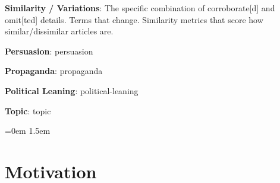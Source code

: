 \textbf{Similarity / Variations}: The specific combination of \gls{corroborate}[d] and \gls{omit}[ted] details. Terms that change. Similarity metrics that score how similar/dissimilar articles are.

\textbf{Persuasion}: \glsdesc*{persuasion}

\textbf{Propaganda}: \glsdesc{propaganda}

\textbf{Political Leaning}: \glsdesc{political-leaning}

\textbf{Topic}: \glsdesc{topic}


\leftskip=0em
\parindent 1.5em


\section{\statusgreen Motivation}
\label{sec:intro_motivation}




